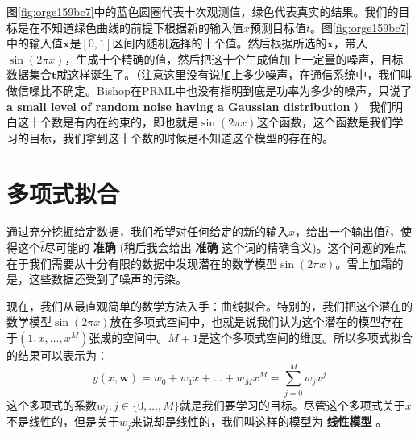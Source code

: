 \documentclass[10pt,a4paper,UTF8]{article}
\begin{document}
图\ref{fig:orge159bc7}中的蓝色圆圈代表十次观测值，绿色代表真实的结果。我们的目标是在不知道绿色曲线的前提下根据新的输入值\(x\)预测目标值\(t\)。图\ref{fig:orge159bc7} 中的输入值\(\mathbf{x}\)是\([0,1]\)区间内随机选择的十个值。然后根据所选的\(\mathbf{x}\)，带入\(\sin(2\pi x)\)，生成十个精确的值，然后把这十个生成值加上一定量的噪声，目标数据集合\(\mathbf{t}\)就这样诞生了。（注意这里没有说加上多少噪声，在通信系统中，我们叫做信噪比不确定。Bishop在PRML中也没有指明到底是功率为多少的噪声，只说了 \textbf{a small level of random noise having a Gaussian distribution} ） 我们明白这十个数是有内在约束的，即也就是\(\sin(2\pi x)\)这个函数，这个函数是我们学习的目标，我们拿到这十个数的时候是不知道这个模型的存在的。
\section{多项式拟合}
\label{sec:orgc9f7c91}


通过充分挖掘给定数据，我们希望对任何给定的新的输入\(\hat{x}\)，给出一个输出值\(\hat{t}\)，使得这个\(\hat{t}\)尽可能的 \textbf{准确} (稍后我会给出 \textbf{准确} 这个词的精确含义)。这个问题的难点在于我们需要从十分有限的数据中发现潜在的数学模型\(\sin(2\pi x)\)。雪上加霜的是，这些数据还受到了噪声的污染。

现在，我们从最直观简单的数学方法入手：曲线拟合。特别的，我们把这个潜在的数学模型\(\sin(2\pi x)\)放在多项式空间中，也就是说我们认为这个潜在的模型存在于\((1,x,\ldots ,x^{M})\)张成的空间中。\(M+1\)是这个多项式空间的维度。所以多项式拟合的结果可以表示为：
\begin{equation}
\label{eq:1}
y(x, \mathbf{w}) = w_{0} + w_{1}x + \ldots + w_{M}x^{M} = \sum_{j=0}^{M}w_{j}x^{j}
\end{equation}
这个多项式的系数\(w_{j},j\in \{0,\ldots ,M\}\)就是我们要学习的目标。尽管这个多项式关于\(x\)不是线性的，但是关于\(w_{j}\)来说却是线性的，我们叫这样的模型为 \textbf{线性模型} 。
\end{document}
